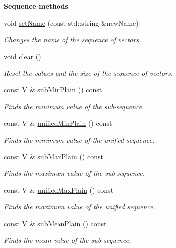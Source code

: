 \begin{Indent}{\bf Sequence methods}
\begin{DoxyCompactItemize}
void \hyperlink{class_q_u_e_s_o_1_1_base_vector_sequence_a0a2f78cd12e0f136f7801f7d0175b849}{set\-Name} (const std\-::string \&new\-Name)
\begin{DoxyCompactList}\small\item\em Changes the name of the sequence of vectors. \end{DoxyCompactList}\item 
void \hyperlink{class_q_u_e_s_o_1_1_base_vector_sequence_aae0804eacc51b37e84b1bd329ce1711c}{clear} ()
\begin{DoxyCompactList}\small\item\em Reset the values and the size of the sequence of vectors. \end{DoxyCompactList}\item 
const V \& \hyperlink{class_q_u_e_s_o_1_1_base_vector_sequence_a1b2c4cb7623e0034e4cd66f6443f2fdd}{sub\-Min\-Plain} () const 
\begin{DoxyCompactList}\small\item\em Finds the minimum value of the sub-\/sequence. \end{DoxyCompactList}\item 
const V \& \hyperlink{class_q_u_e_s_o_1_1_base_vector_sequence_a5d330cec5b2c7d9d7eb8079bed4a07ea}{unified\-Min\-Plain} () const 
\begin{DoxyCompactList}\small\item\em Finds the minimum value of the unified sequence. \end{DoxyCompactList}\item 
const V \& \hyperlink{class_q_u_e_s_o_1_1_base_vector_sequence_a152da47e6633bcac5f32b588b98d6f4f}{sub\-Max\-Plain} () const 
\begin{DoxyCompactList}\small\item\em Finds the maximum value of the sub-\/sequence. \end{DoxyCompactList}\item 
const V \& \hyperlink{class_q_u_e_s_o_1_1_base_vector_sequence_a277e760600eb5aa64da9561634a19d63}{unified\-Max\-Plain} () const 
\begin{DoxyCompactList}\small\item\em Finds the maximum value of the unified sequence. \end{DoxyCompactList}\item 
const V \& \hyperlink{class_q_u_e_s_o_1_1_base_vector_sequence_aba7a42fcab55a24264ff80e12d7da2de}{sub\-Mean\-Plain} () const 
\begin{DoxyCompactList}\small\item\em Finds the mean value of the sub-\/sequence. \end{DoxyCompactList}\item 

\end{DoxyCompactItemize}
\end{Indent}
